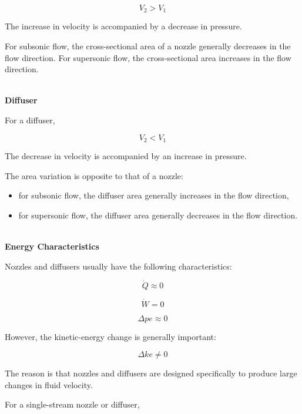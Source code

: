 \documentclass[12pt]{article}
\begin{document}
\begin{equation*}
V_2 > V_1
\end{equation*}

The increase in velocity is accompanied by a decrease in pressure.

For subsonic flow, the cross-sectional area of a nozzle generally decreases in the flow direction. For supersonic flow, the cross-sectional area increases in the flow direction.

\textbf{\\ Diffuser}

For a diffuser,

\begin{equation*}
V_2 < V_1
\end{equation*}

The decrease in velocity is accompanied by an increase in pressure.

The area variation is opposite to that of a nozzle:

\begin{itemize}
    \item for subsonic flow, the diffuser area generally increases in the flow direction,
    \item for supersonic flow, the diffuser area generally decreases in the flow direction.
\end{itemize}

\textbf{\\ Energy Characteristics}

Nozzles and diffusers usually have the following characteristics:

\begin{equation*}
\dot{Q}\approx0
\end{equation*}

\begin{equation*}
\dot{W}=0
\end{equation*}

\begin{equation*}
\Delta pe\approx0
\end{equation*}

However, the kinetic-energy change is generally important:

\begin{equation*}
\Delta ke\neq0
\end{equation*}

The reason is that nozzles and diffusers are designed specifically to produce large changes in fluid velocity.

For a single-stream nozzle or diffuser,
\end{document}
